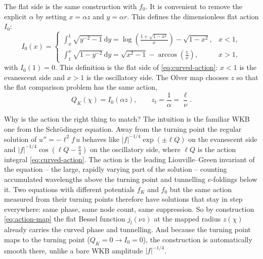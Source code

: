 \documentclass[11pt,a4paper]{article}
\newcommand{\dd}{\mathrm{d}}
\begin{document}
The flat side is the same construction with \(f_0\).  It is convenient to remove
the explicit \(\alpha\) by setting \(x=\alpha z\) and \(y=\alpha r\).  This
defines the dimensionless flat action \(I_0\):
\begin{equation}
  I_0(x)=
  \begin{cases}
  \displaystyle
  \int_x^1\sqrt{y^{-2}-1}\,\dd y
  =\log\left(\frac{1+\sqrt{1-x^2}}{x}\right)-\sqrt{1-x^2}, & x<1,\\[1.5ex]
  \displaystyle
  \int_1^x\sqrt{1-y^{-2}}\,\dd y
  =\sqrt{x^2-1}-\arccos\left(\frac{1}{x}\right), & x>1,
  \end{cases}
  \label{eq:flat-action}
\end{equation}
with \(I_0(1)=0\).  This definition is the flat side of
\eqref{eq:curved-action}: \(x<1\) is the evanescent side and \(x>1\) is the
oscillatory side.  The Olver map chooses \(z\) so that the flat comparison
problem has the same action,
\begin{equation}
  Q_K(\chi)=I_0(\alpha z),
  \qquad z_t=\frac{1}{\alpha}=\frac{\ell}{\nu}.
  \label{eq:action-map}
\end{equation}

Why is the action the right thing to match?  The intuition is the familiar WKB
one from the Schr\"odinger equation.  Away from the turning
point the regular solution of \(u''=-\ell^2 f\,u\) behaves like
\(|f|^{-1/4}\exp(\pm\ell Q)\) on the evanescent side and
\(|f|^{-1/4}\cos(\ell Q-\tfrac\pi4)\) on the oscillatory side, where \(\ell Q\) is
the action integral \eqref{eq:curved-action}.  The action is the leading
Liouville--Green invariant of the equation -- the large, rapidly varying part of
the solution -- counting accumulated wavelengths above the turning point and
tunnelling \(e\)-foldings below it.  Two equations with different potentials
\(f_K\) and \(f_0\) but the same action measured from their turning points
therefore have solutions that stay in step everywhere: same phase, same node
count, same suppression.  So by construction \eqref{eq:action-map} the flat
Bessel function \(j_l(\nu z)\) at the mapped radius \(z(\chi)\) already carries
the curved phase and tunnelling.  And because the turning point maps to the
turning point (\(Q_K=0\to I_0=0\)), the construction is automatically smooth
there, unlike a bare WKB amplitude \(|f|^{-1/4}\).
\end{document}

